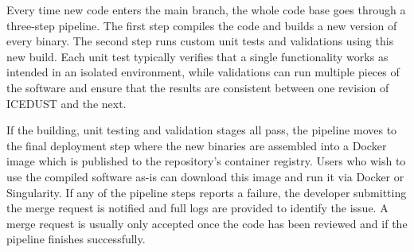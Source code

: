 Every time new code enters the main branch, the whole code base goes through a three-step pipeline. The first step compiles the code and builds a new version of every binary. The second step runs custom unit tests and validations using this new build. Each unit test typically verifies that a single functionality works as intended in an isolated environment, while validations can run multiple pieces of the software and ensure that the results are consistent between one revision of ICEDUST and the next.

If the building, unit testing and validation stages all pass, the pipeline moves to the final deployment step where the new binaries are assembled into a Docker image which is published to the repository's container registry. Users who wish to use the compiled software as-is can download this image and run it via Docker or Singularity.
If any of the pipeline steps reports a failure, the developer submitting the merge request is notified and full logs are provided to identify the issue. A merge request is usually only accepted once the code has been reviewed and if the pipeline finishes successfully.

